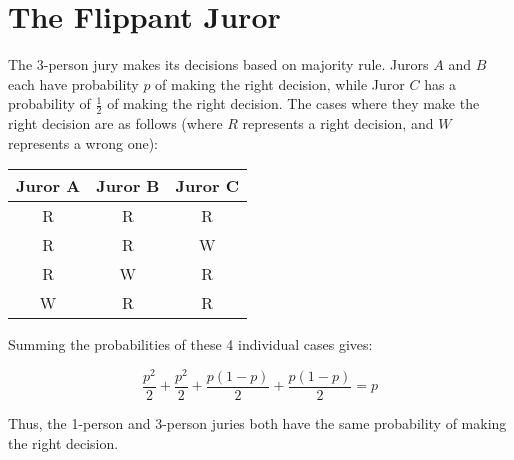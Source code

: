 \documentclass{article}
\date{}
\author{Kaan Aksoy | Feb 10, 2020}
\begin{document}
\maketitle

\section{The Flippant Juror}

The 3-person jury makes its decisions based on majority rule. Jurors $A$ 
and $B$ each have probability $p$ of making the right decision, while 
Juror $C$ has a probability of $\frac{1}{2}$ of making the right decision. 
The cases where they make the right decision are as follows (where 
$R$ represents a right decision, and $W$ represents a wrong one):

\begin{center}
\begin{tabular}{ |c|c|c| }
 \hline
 Juror A & Juror B & Juror C \\ 
 \hline
 R & R & R \\  
 R & R & W \\ 
 R & W & R \\  
 W & R & R \\  
 \hline
\end{tabular}
\end{center}

Summing the probabilities of these 4 individual cases gives:

$$ \frac{p^2}{2} + \frac{p^2}{2} + \frac{p(1-p)}{2} + \frac{p(1-p)}{2} = p $$

Thus, the 1-person and 3-person juries both have the same probability 
of making the right decision.
\end{document}
